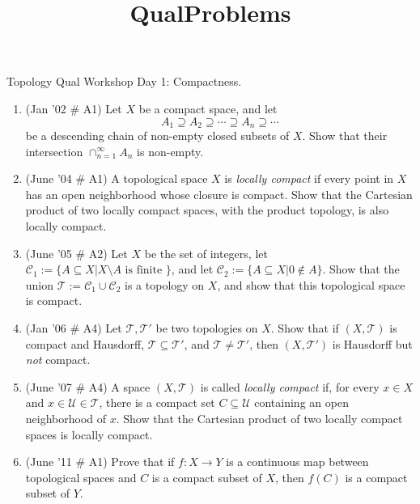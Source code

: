 \documentclass[psamsfonts, 11pt, reqno]{amsart}
\title{QualProblems}
\begin{document}
\begin{center}
\begin{large}
Topology Qual Workshop Day 1: Compactness.
\end{large}
\end{center}
\vspace{.25in}

\begin{enumerate}
\item (Jan '02 \# A1) Let $X$ be a compact space, and let
$$A_1 \supseteq A_2 \supseteq \cdots \supseteq A_n \supseteq \cdots$$
be a descending chain of non-empty closed subsets of $X$.  Show that their
intersection $\cap_{n=1}^{\infty} A_n$ is non-empty.
\vfill

\item (June '04 \# A1) A topological space $X$ is \emph{locally compact} if every point in $X$ has an open
neighborhood whose closure is compact.  Show that the Cartesian product of two locally compact spaces,
with the product topology, is also locally compact.
\vfill

\item (June '05 \# A2) Let $X$ be the set of integers, let $\mathcal{C}_1 := \{ A \subseteq X | X \setminus A \mbox{ is finite }\}$,
and let $\mathcal{C}_2 := \{ A \subseteq X | 0 \notin A \}.$  Show that the union $\mathcal{T}:=\mathcal{C}_1 \cup \mathcal{C}_2$ is
a topology on $X$, and show that this topological space is compact.
\vfill

\item (Jan '06 \# A4) Let $\mathcal{T}, \mathcal{T}'$ be two topologies on $X$.  Show that if $(X, \mathcal{T})$ is compact and
Hausdorff, $\mathcal{T} \subseteq \mathcal{T}'$, and $\mathcal{T} \neq \mathcal{T}'$, then $(X, \mathcal{T}')$ is
Hausdorff but \emph{not} compact.

\vfill

\item (June '07 \# A4) A space $(X, \mathcal{T})$ is called \emph{locally compact} if, for every $x \in X$ and $x \in \mathcal{U} \in 
\mathcal{T}$, there is a compact set $C \subseteq \mathcal{U}$ containing an open neighborhood of $x$.  Show that
the Cartesian product of two locally compact spaces is locally compact.
\vfill

\item (June '11 \# A1) Prove that if $f: X\rightarrow Y$ is a continuous map between topological spaces and $C$
is a compact subset of $X$, then $f(C)$ is a compact subset of $Y$.
\vfill


\end{enumerate}
\end{document}
